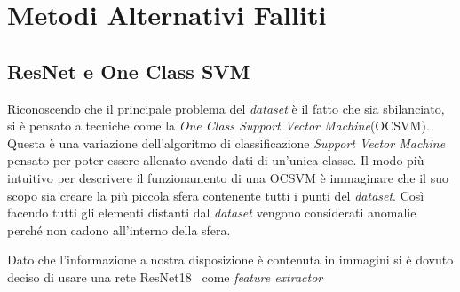 
\chapter{Metodi Alternativi Falliti}



\section{ResNet e One Class SVM}
Riconoscendo che il principale problema del \textit{dataset} è il fatto che sia sbilanciato, si è pensato a tecniche come la \textit{One Class Support Vector Machine}(OCSVM).
Questa è una variazione dell'algoritmo di classificazione \textit{Support Vector Machine} pensato per poter essere allenato avendo dati di un'unica classe.
Il modo più intuitivo per descrivere il funzionamento di una OCSVM è immaginare che il suo scopo sia creare la più piccola sfera contenente tutti i punti del \textit{dataset}.
Così facendo tutti gli elementi distanti dal \textit{dataset} vengono considerati anomalie perché non cadono all'interno della sfera.

Dato che l'informazione a nostra disposizione è contenuta in immagini si è dovuto deciso di usare una rete ResNet18~\cite{resnet} come \textit{feature extractor}
















